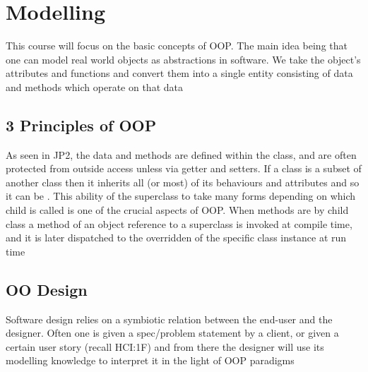 
\section{Modelling}


	\par{This course will focus on the basic concepts of OOP. The main idea
being that one can model real world objects as abstractions in software. We take
the object's attributes and functions and convert them into a single entity
consisting of data and methods which operate on that data}

\subsection{3 Principles of OOP}


	\par{As seen in JP2, the data and methods are defined within the class, and
are often protected from outside access unless via getter and setters. If a
class is a subset of another class then it inherits all (or most) of its
behaviours and attributes and so it can be . This ability of the
superclass to take many forms depending on which child is called is one of the
crucial aspects of OOP. When methods are  by child class a
method of an object reference to a superclass is invoked at compile time, and it
is later dispatched to the overridden of the specific class instance at run time} 

\subsection{OO Design}

	\par{Software design relies on a symbiotic relation between the end-user and
the designer. Often one is given a spec/problem statement by a client, or given
a certain user story (recall HCI:1F) and from there the designer will use its
modelling knowledge to interpret it in the light of OOP paradigms}
	
